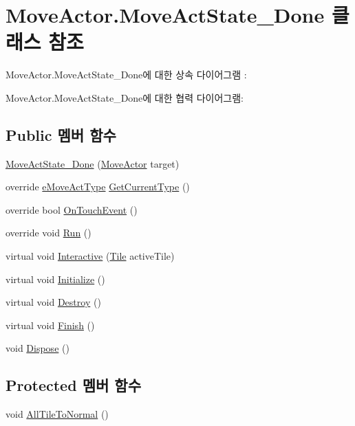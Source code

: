 \hypertarget{class_move_actor_1_1_move_act_state___done}{}\section{Move\+Actor.\+Move\+Act\+State\+\_\+\+Done 클래스 참조}
\label{class_move_actor_1_1_move_act_state___done}


Move\+Actor.\+Move\+Act\+State\+\_\+\+Done에 대한 상속 다이어그램 \+: 


Move\+Actor.\+Move\+Act\+State\+\_\+\+Done에 대한 협력 다이어그램\+:
\subsection*{Public 멤버 함수}
\begin{DoxyCompactItemize}
\item 
\hyperlink{class_move_actor_1_1_move_act_state___done_a9b6320c0503f3e898508c8fd500926af}{Move\+Act\+State\+\_\+\+Done} (\hyperlink{class_move_actor}{Move\+Actor} target)
\item 
override \hyperlink{_move_actor_8cs_a1df5a2532cc7e6bde40a57d2dcbe23fe}{e\+Move\+Act\+Type} \hyperlink{class_move_actor_1_1_move_act_state___done_a5c487d834573da3e3a5cf3a751ee0c02}{Get\+Current\+Type} ()
\item 
override bool \hyperlink{class_move_actor_1_1_move_act_state___done_aed4a067b6d21ce96d826ecd67e7666da}{On\+Touch\+Event} ()
\item 
override void \hyperlink{class_move_actor_1_1_move_act_state___done_a50f24c5382008b0205b7d5280880600f}{Run} ()
\item 
virtual void \hyperlink{class_move_actor_1_1_move_act_state_ae43bc38159d36bd83eaf172d946c0415}{Interactive} (\hyperlink{class_tile}{Tile} active\+Tile)
\item 
virtual void \hyperlink{class_m_c_n_1_1_state_a8eabaffe047e6dccd5c5d8aed7bf218a}{Initialize} ()
\item 
virtual void \hyperlink{class_m_c_n_1_1_state_a32af22a6a0a979d3b3a80225426aa839}{Destroy} ()
\item 
virtual void \hyperlink{class_m_c_n_1_1_state_a6de4f94b23916fcd05f589759da9ac3f}{Finish} ()
\item 
void \hyperlink{class_m_c_n_1_1_state_a6c53b2eda47e718ff469fd76a95cf02a}{Dispose} ()
\end{DoxyCompactItemize}
\subsection*{Protected 멤버 함수}
\begin{DoxyCompactItemize}
\item 
void \hyperlink{class_move_actor_1_1_move_act_state_a8e1d5e7942d4f9de8c8e0732964c554b}{All\+Tile\+To\+Normal} ()
\end{DoxyCompactItemize}
